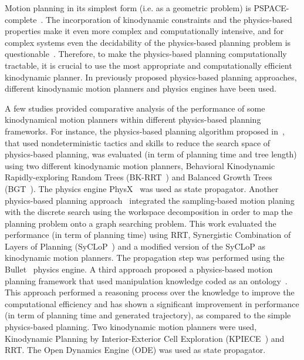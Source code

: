 \documentclass[runningheads,a4paper]{llncs}
\begin{document}
Motion planning in its simplest form (i.e. as a geometric problem) is PSPACE-complete~\cite{reif1979}. The incorporation
of kinodynamic constraints and the physics-based properties make it even more complex and computationally intensive, and for complex systems
even the decidability of the physics-based planning problem is questionable~\cite{cheng2007}.
Therefore, to make the physics-based planning computationally tractable, it is crucial to use the most appropriate and computationally efficient
kinodynamic planner. In previously proposed physics-based planning approaches, different kinodynamic motion planners and physics engines have been used.

A few studies provided comparative analysis of the performance of some kinodynamical motion planners within   different  physics-based planning frameworks.
For instance, the physics-based planning algorithm proposed in~\cite{zickler2009}, that used nondeterministic tactics and skills to reduce the search space of
physics-based planning, was evaluated (in term of planning time and tree length) using two different kinodynamic motion planners,
Behavioral Kinodynamic Rapidly-exploring Random Trees (BK-RRT~\cite{zickler20}) and  Balanced Growth Trees (BGT~\cite{zickler2009}).
The physics engine PhysX~\cite{physx} was used as
state propagator.
Another physics-based planning approach~\cite{plaku2012} integrated the sampling-based motion planing
with the discrete search using the workspace decomposition in order to map the planning problem onto a graph searching problem. This work
evaluated the performance (in term of planning time) using  RRT, Synergistic Combination of Layers of Planning (SyCLoP~\cite{Plaku2010}) and a modified version of the SyCLoP
as kinodynamic motion planners. The propagation step was performed using the Bullet~\cite{bullet2013} physics engine.
A third approach  proposed a physics-based motion planning framework that used manipulation knowledge coded as an ontology~\cite{muhayyuddin2015}.
This approach performed a reasoning process over the knowledge to improve the computational efficiency and has shown a significant
improvement in performance (in term of planning time and generated trajectory), as compared to the simple physics-based planning.
Two kinodynamic motion planners were used, Kinodynamic Planning by Interior-Exterior Cell Exploration (KPIECE~\cite{sucan2012}) and RRT. The Open Dynamics Engine (ODE) was used
as state propagator.
\end{document}
